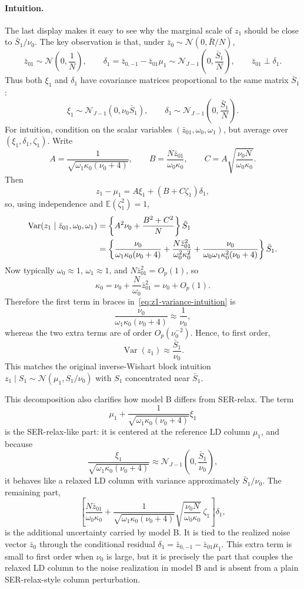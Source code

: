 \documentclass[11pt]{article}
\newcommand{\E}{\mathbb E}
\newcommand{\Var}{\operatorname{Var}}
\newcommand{\Normal}{\mathcal N}
\begin{document}
\paragraph{Intuition.}
The last display makes it easy to see why the marginal scale of $z_1$ should
be close to $\bar S_1/\nu_0$. The key observation is that, under
$\bar z_0\sim\Normal(0,\bar R/N)$,
\[
\bar z_{01}\sim\Normal\left(0,\frac1N\right),
\qquad
\delta_1=\bar z_{0,-1}-\bar z_{01}\mu_1
\sim
\Normal_{J-1}\left(0,\frac{\bar S_1}{N}\right),
\qquad
\bar z_{01}\perp \delta_1.
\]
Thus both $\xi_1$ and $\delta_1$ have covariance matrices proportional to the
same matrix $\bar S_1$:
\[
\xi_1\sim\Normal_{J-1}(0,\nu_0\bar S_1),
\qquad
\delta_1\sim\Normal_{J-1}\left(0,\frac{\bar S_1}{N}\right).
\]
For intuition, condition on the scalar variables
$(\bar z_{01},\omega_0,\omega_1)$, but average over
$(\xi_1,\delta_1,\zeta_1)$. Write
\[
A=\frac{1}{\sqrt{\omega_1\kappa_0(\nu_0+4)}},
\qquad
B=\frac{N\bar z_{01}}{\omega_0\kappa_0},
\qquad
C=A\sqrt{\frac{\nu_0 N}{\omega_0\kappa_0}}.
\]
Then
\[
z_1-\mu_1=A\xi_1+(B+C\zeta_1)\delta_1,
\]
so, using independence and $\E(\zeta_1^2)=1$,
\begin{align}
\Var(z_1\mid \bar z_{01},\omega_0,\omega_1)
&=
\left\{
A^2\nu_0+\frac{B^2+C^2}{N}
\right\}\bar S_1
\notag\\
&=
\left\{
\frac{\nu_0}{\omega_1\kappa_0(\nu_0+4)}
+\frac{N\bar z_{01}^2}{\omega_0^2\kappa_0^2}
+\frac{\nu_0}{\omega_0\omega_1\kappa_0^2(\nu_0+4)}
\right\}\bar S_1.
\label{eq:z1-variance-intuition}
\end{align}
Now typically $\omega_0\approx1$, $\omega_1\approx1$, and
$N\bar z_{01}^2=O_p(1)$, so
\[
\kappa_0=\nu_0+\frac{N}{\omega_0}\bar z_{01}^2
=\nu_0+O_p(1).
\]
Therefore the first term in braces in~\eqref{eq:z1-variance-intuition} is
\[
\frac{\nu_0}{\omega_1\kappa_0(\nu_0+4)}
\approx
\frac{1}{\nu_0},
\]
whereas the two extra terms are of order $O_p(\nu_0^{-2})$. Hence, to first
order,
\[
\Var(z_1)\approx \frac{\bar S_1}{\nu_0}.
\]
This matches the original inverse-Wishart block intuition
$z_1\mid S_1\sim\Normal(\mu_1,S_1/\nu_0)$ with $S_1$ concentrated near
$\bar S_1$.

This decomposition also clarifies how model B differs from SER-relax. The term
\[
\mu_1+\frac{1}{\sqrt{\omega_1\kappa_0(\nu_0+4)}}\xi_1
\]
is the SER-relax-like part: it is centered at the reference LD column
$\mu_1$, and because
\[
\frac{\xi_1}{\sqrt{\omega_1\kappa_0(\nu_0+4)}}
\approx
\Normal_{J-1}\left(0,\frac{\bar S_1}{\nu_0}\right),
\]
it behaves like a relaxed LD column with variance approximately
$\bar S_1/\nu_0$. The remaining part,
\[
\left[
\frac{N\bar z_{01}}{\omega_0\kappa_0}
+\frac{1}{\sqrt{\omega_1\kappa_0(\nu_0+4)}}
\sqrt{\frac{\nu_0 N}{\omega_0\kappa_0}}\,
\zeta_1
\right]\delta_1,
\]
is the additional uncertainty carried by model B. It is tied to the realized
noise vector $\bar z_0$ through the conditional residual
$\delta_1=\bar z_{0,-1}-\bar z_{01}\mu_1$. This extra term is small to first
order when $\nu_0$ is large, but it is precisely the part that couples the
relaxed LD column to the noise realization in model B and is absent from a
plain SER-relax-style column perturbation.
\end{document}
